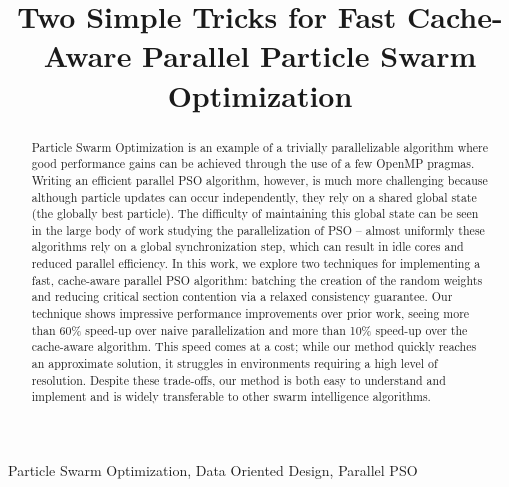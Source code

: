 \documentclass[conference]{IEEEtran}
\begin{document}
\title{Two Simple Tricks for Fast Cache-Aware Parallel Particle Swarm Optimization}

\author{
\and
{}
}

\maketitle

\begin{abstract}
Particle Swarm Optimization is an example of a trivially parallelizable
algorithm where good performance gains can be achieved through the use of a few
OpenMP pragmas. Writing an efficient parallel PSO algorithm, however, is much more
challenging because although particle updates can occur independently, they
rely on a shared global state (the globally best particle). The difficulty of
maintaining this global state can be seen in the large body of work studying the
parallelization of PSO -- almost uniformly these algorithms rely on a global
synchronization step, which can result in idle cores and reduced parallel
efficiency. In this work, we explore two techniques for implementing a fast,
cache-aware parallel PSO algorithm: batching the creation of the random weights
and reducing critical section contention via a relaxed consistency guarantee.
Our technique shows impressive performance improvements over prior work, seeing
more than 60\% speed-up over naive parallelization and more than 10\% speed-up
over the cache-aware algorithm. This speed comes at a cost; while our method
quickly reaches an approximate solution, it struggles in environments requiring
a high level of resolution. Despite these trade-offs, our method is both
easy to understand and implement and is widely transferable to other
swarm intelligence algorithms.
\end{abstract}

\begin{IEEEkeywords}
Particle Swarm Optimization, Data Oriented Design, Parallel PSO
\end{IEEEkeywords}





\end{document}
